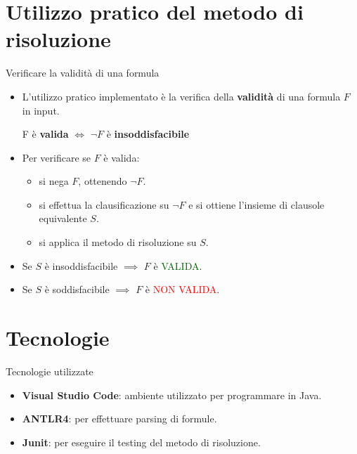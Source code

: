 \documentclass{beamer}
\begin{document}
\section{Utilizzo pratico del metodo di risoluzione}

\begin{frame}{Verificare la validità di una formula}
    \begin{itemize}
        \item L'utilizzo pratico implementato è la verifica della \textbf{validità} di una formula $F$ in input.
        \vspace{5px}
        \begin{center}
            F è \textbf{valida} $\iff$ $\lnot F$ è \textbf{insoddisfacibile}
        \end{center}
        \vspace{5px}
        \item Per verificare se $F$ è valida:
        \begin{itemize}
            \item si nega $F$, ottenendo $\lnot F$.
            \item si effettua la clausificazione su $\lnot F$ e si ottiene l'insieme di clausole equivalente $S$.
            \item si applica il metodo di risoluzione su $S$.
        \end{itemize}
        \item Se $S$ è insoddisfacibile $\implies$ $F$ è \textcolor{darkgreen}{VALIDA}.
        \item Se $S$ è soddisfacibile $\implies$ $F$ è \textcolor{red}{NON VALIDA}.
    \end{itemize}
\end{frame}

\section{Tecnologie}
\begin{frame}{Tecnologie utilizzate}
    \begin{itemize}
        \item \textbf{Visual Studio Code}: ambiente utilizzato per programmare in Java.
        \vspace{10px}
        \item \textbf{ANTLR4}: per effettuare parsing di formule.
        \vspace{10px}
        \item \textbf{Junit}: per eseguire il testing del metodo di risoluzione.
    \end{itemize}
\end{frame}


\backmatter
\end{document}
